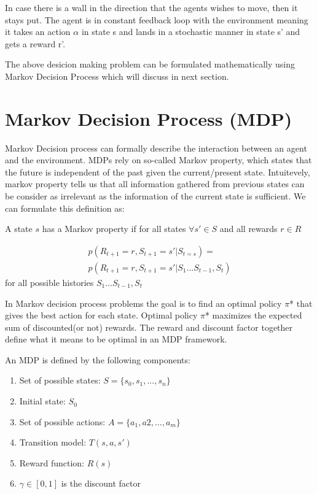 \documentclass[10pt,a4paper,twocolumn]{article}
\begin{document}
	

	In case there is a wall in the direction that the agents wishes to move, then it stays put.
	The agent is in constant feedback loop with the environment meaning it takes an action $\alpha$ in state s and lands in a stochastic manner in state s’ and gets a reward r'.
	
	The above desicion making problem can be formulated mathematically using Markov Decision Process which will discuss in next section.
	
	\section{Markov Decision Process (MDP)}
	
	Markov Decision process can formally describe the interaction between an agent and the environment. MDPs rely on so-called Markov property, which states that the future is independent of the past given the current/present state. Intuitevely, markov property tells us that all information gathered from previous states can be consider as irrelevant as the information of the current state is sufficient. We can formulate this definition as:
	
	A state $s$ has a Markov property if for all states $\forall{s'} \in S$ and all rewards $r \in R$
	
	\begin{equation}
		\begin{split}
			p(R_{t+1} = r , S_{t+1}=s' | S_{t=s}) = \\ 
		 	p(R_{t+1} = r , S_{t+1}=s' | S_{1} ... S_{t-1}, S_{t})
		\end{split}
	\end{equation}
	for all possible histories $ S_{1} ... S_{t-1}, S_{t} $
	
	In Markov decision process problems the goal is to find an optimal policy $\pi$* that gives  the best action for each state. Optimal policy $\pi$* maximizes the expected sum of discounted(or not) rewards. The reward and discount factor together define what it means to be optimal in an MDP framework.
	
	An MDP is defined by the following components:
	\begin{enumerate}
		\item Set of possible states: $S = \{ s_{0}, s_{1}, ..., s_{n} \}$
		\item Initial state: $S_{0}$
		\item Set of possible actions: $A = \{ a_{1}, a{2}, ..., a_{m} \}$
		\item Transition model: $T(s, a, s')$
		\item Reward function: $R(s)$
		\item $\gamma \in [0,1] $ is the discount factor
	\end{enumerate}
\end{document}
